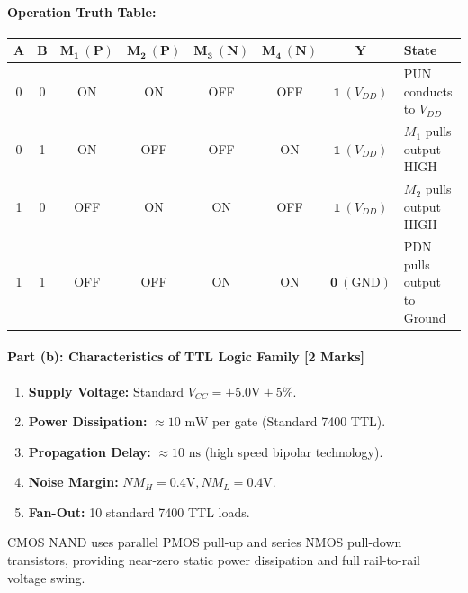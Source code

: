 \documentclass[11pt,a4paper,oneside]{book}
\begin{document}
\paragraph{Operation Truth Table:}
\begin{center}
\begin{tabular}{|cc||cc|cc||c|l|}
\hline
$\mathbf{A}$ & $\mathbf{B}$ & $\mathbf{M_1\ (P)}$ & $\mathbf{M_2\ (P)}$ & $\mathbf{M_3\ (N)}$ & $\mathbf{M_4\ (N)}$ & $\mathbf{Y}$ & \textbf{State} \\ \hline
0 & 0 & ON & ON & OFF & OFF & $\mathbf{1}\ (V_{DD})$ & PUN conducts to $V_{DD}$ \\ \hline
0 & 1 & ON & OFF & OFF & ON & $\mathbf{1}\ (V_{DD})$ & $M_1$ pulls output HIGH \\ \hline
1 & 0 & OFF & ON & ON & OFF & $\mathbf{1}\ (V_{DD})$ & $M_2$ pulls output HIGH \\ \hline
1 & 1 & OFF & OFF & ON & ON & $\mathbf{0}\ (\text{GND})$ & PDN pulls output to Ground \\ \hline
\end{tabular}
\end{center}

\paragraph{Part (b): Characteristics of TTL Logic Family [2 Marks]}
\begin{enumerate}
  \item \textbf{Supply Voltage:} Standard $V_{CC} = +5.0\text{V} \pm 5\%$.
  \item \textbf{Power Dissipation:} $\approx 10\text{ mW}$ per gate (Standard 7400 TTL).
  \item \textbf{Propagation Delay:} $\approx 10\text{ ns}$ (high speed bipolar technology).
  \item \textbf{Noise Margin:} $NM_H = 0.4\text{V}, NM_L = 0.4\text{V}$.
  \item \textbf{Fan-Out:} 10 standard 7400 TTL loads.
\end{enumerate}

\begin{answerbox}
CMOS NAND uses parallel PMOS pull-up and series NMOS pull-down transistors, providing near-zero static power dissipation and full rail-to-rail voltage swing.
\end{answerbox}

\vspace{0.6cm}

\end{document}
